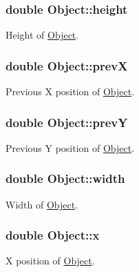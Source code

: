 \subsubsection[{\texorpdfstring{height}{height}}]{\setlength{\rightskip}{0pt plus 5cm}double Object\+::height\hspace{0.3cm}{\ttfamily [protected]}}\hypertarget{class_object_a811bf2cbf614c4f0a3935a83fb639ffd}{}\label{class_object_a811bf2cbf614c4f0a3935a83fb639ffd}
Height of \hyperlink{class_object}{Object}. 
\subsubsection[{\texorpdfstring{prevX}{prevX}}]{\setlength{\rightskip}{0pt plus 5cm}double Object\+::prevX\hspace{0.3cm}{\ttfamily [protected]}}\hypertarget{class_object_a7fc555584143839562b90d46d294468e}{}\label{class_object_a7fc555584143839562b90d46d294468e}
Previous X position of \hyperlink{class_object}{Object}. 
\subsubsection[{\texorpdfstring{prevY}{prevY}}]{\setlength{\rightskip}{0pt plus 5cm}double Object\+::prevY\hspace{0.3cm}{\ttfamily [protected]}}\hypertarget{class_object_a78d0f1c37128468d36f96bd2451b63ef}{}\label{class_object_a78d0f1c37128468d36f96bd2451b63ef}
Previous Y position of \hyperlink{class_object}{Object}. 
\subsubsection[{\texorpdfstring{width}{width}}]{\setlength{\rightskip}{0pt plus 5cm}double Object\+::width\hspace{0.3cm}{\ttfamily [protected]}}\hypertarget{class_object_a3afad0ab476968e517b6f48c2a32719f}{}\label{class_object_a3afad0ab476968e517b6f48c2a32719f}
Width of \hyperlink{class_object}{Object}. 
\subsubsection[{\texorpdfstring{x}{x}}]{\setlength{\rightskip}{0pt plus 5cm}double Object\+::x\hspace{0.3cm}{\ttfamily [protected]}}\hypertarget{class_object_a02010c1708632be33a760486b1f648f8}{}\label{class_object_a02010c1708632be33a760486b1f648f8}
X position of \hyperlink{class_object}{Object}. 
